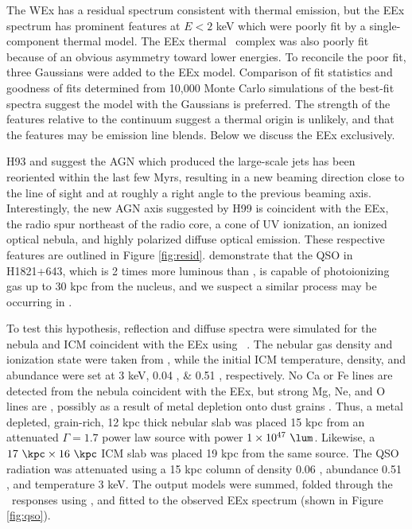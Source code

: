 \documentclass[useAMS,usenatbib]{mn2e}
\begin{document}
The WEx has a residual spectrum consistent with thermal emission, but
the EEx spectrum has prominent features at $E < 2$ keV which were
poorly fit by a single-component thermal model. The EEx thermal
\feka\ complex was also poorly fit because of an obvious asymmetry
toward lower energies. To reconcile the poor fit, three Gaussians were
added to the EEx model. Comparison of fit statistics and goodness of
fits determined from 10,000 Monte Carlo simulations of the best-fit
spectra suggest the model with the Gaussians is preferred. The
strength of the features relative to the continuum suggest a thermal
origin is unlikely, and that the features may be emission line
blends. Below we discuss the EEx exclusively.

H93 and \citet[][hereafter H99]{1999ApJ...512..145H} suggest the AGN
which produced the large-scale jets has been reoriented within the
last few Myrs, resulting in a new beaming direction close to the line
of sight and at roughly a right angle to the previous beaming
axis. Interestingly, the new AGN axis suggested by H99 is coincident
with the EEx, the radio spur northeast of the radio core, a cone of UV
ionization, an ionized optical nebula, and highly polarized diffuse
optical emission. These respective features are outlined in Figure
\ref{fig:resid}. \citet{2010MNRAS.402.1561R} demonstrate that the QSO
in H1821+643, which is 2 times more luminous than \irs, is capable of
photoionizing gas up to 30 kpc from the nucleus, and we suspect a
similar process may be occurring in \irs.

To test this hypothesis, reflection and diffuse spectra were simulated
for the nebula and ICM coincident with the EEx using
\cloudy\ \citep{cloudy}. The nebular gas density and ionization state
were taken from \citet{2000AJ....120..562T}, while the initial ICM
temperature, density, and abundance were set at 3 keV, 0.04 \pcc, \&
0.51 \Zsol, respectively. No Ca or Fe lines are detected from the
nebula coincident with the EEx, but strong Mg, Ne, and O lines are
\citep{2000AJ....120..562T}, possibly as a result of metal depletion
onto dust grains \citep[\eg][]{1993ApJ...414L..17D}. Thus, a metal
depleted, grain-rich, 12 kpc thick nebular slab was placed 15 kpc from
an attenuated $\Gamma = 1.7$ power law source with power $1 \times
10^{47} ~\lum$. Likewise, a $17 ~\kpc \times 16 ~\kpc$ ICM slab was
placed 19 kpc from the same source. The QSO radiation was attenuated
using a 15 kpc column of density 0.06 \pcc, abundance 0.51 \Zsol, and
temperature 3 keV. The output models were summed, folded through the
\chandra\ responses using \xspec, and fitted to the observed EEx
spectrum (shown in Figure \ref{fig:qso}).
\end{document}
